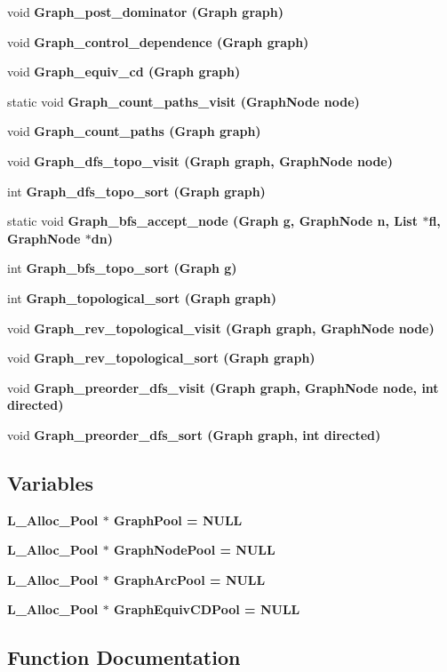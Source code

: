 \begin{CompactItemize}
\item 
void \bf{Graph\_\-post\_\-dominator} (\bf{Graph} \bf{graph})
\item 
void \bf{Graph\_\-control\_\-dependence} (\bf{Graph} \bf{graph})
\item 
void \bf{Graph\_\-equiv\_\-cd} (\bf{Graph} \bf{graph})
\item 
static void \bf{Graph\_\-count\_\-paths\_\-visit} (\bf{Graph\-Node} \bf{node})
\item 
void \bf{Graph\_\-count\_\-paths} (\bf{Graph} \bf{graph})
\item 
void \bf{Graph\_\-dfs\_\-topo\_\-visit} (\bf{Graph} \bf{graph}, \bf{Graph\-Node} \bf{node})
\item 
int \bf{Graph\_\-dfs\_\-topo\_\-sort} (\bf{Graph} \bf{graph})
\item 
static void \bf{Graph\_\-bfs\_\-accept\_\-node} (\bf{Graph} g, \bf{Graph\-Node} n, \bf{List} $\ast$fl, \bf{Graph\-Node} $\ast$dn)
\item 
int \bf{Graph\_\-bfs\_\-topo\_\-sort} (\bf{Graph} g)
\item 
int \bf{Graph\_\-topological\_\-sort} (\bf{Graph} \bf{graph})
\item 
void \bf{Graph\_\-rev\_\-topological\_\-visit} (\bf{Graph} \bf{graph}, \bf{Graph\-Node} \bf{node})
\item 
void \bf{Graph\_\-rev\_\-topological\_\-sort} (\bf{Graph} \bf{graph})
\item 
void \bf{Graph\_\-preorder\_\-dfs\_\-visit} (\bf{Graph} \bf{graph}, \bf{Graph\-Node} \bf{node}, int directed)
\item 
void \bf{Graph\_\-preorder\_\-dfs\_\-sort} (\bf{Graph} \bf{graph}, int directed)
\end{CompactItemize}
\subsection*{Variables}
\begin{CompactItemize}
\item 
\bf{L\_\-Alloc\_\-Pool} $\ast$ \bf{Graph\-Pool} = NULL
\item 
\bf{L\_\-Alloc\_\-Pool} $\ast$ \bf{Graph\-Node\-Pool} = NULL
\item 
\bf{L\_\-Alloc\_\-Pool} $\ast$ \bf{Graph\-Arc\-Pool} = NULL
\item 
\bf{L\_\-Alloc\_\-Pool} $\ast$ \bf{Graph\-Equiv\-CDPool} = NULL
\end{CompactItemize}


\subsection{Function Documentation}

